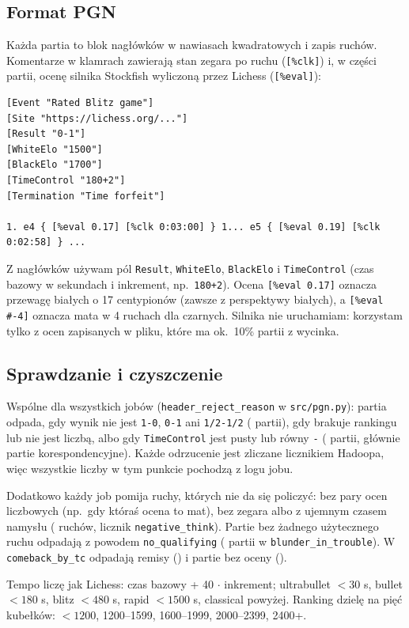 \documentclass[11pt,a4paper]{article}
\newcommand{\kod}[1]{\texttt{#1}}
\begin{document}
\subsection{Format PGN}
Każda partia to blok nagłówków w nawiasach kwadratowych i zapis ruchów. Komentarze w klamrach zawierają stan zegara po ruchu (\kod{[\%clk]}) i, w części partii, ocenę silnika Stockfish wyliczoną przez Lichess (\kod{[\%eval]}):
\begin{lstlisting}[style=plain]
[Event "Rated Blitz game"]
[Site "https://lichess.org/..."]
[Result "0-1"]
[WhiteElo "1500"]
[BlackElo "1700"]
[TimeControl "180+2"]
[Termination "Time forfeit"]

1. e4 { [%eval 0.17] [%clk 0:03:00] } 1... e5 { [%eval 0.19] [%clk 0:02:58] } ...
\end{lstlisting}
Z nagłówków używam pól \kod{Result}, \kod{WhiteElo}, \kod{BlackElo} i \kod{TimeControl} (czas bazowy w sekundach i inkrement, np.\ \kod{180+2}). Ocena \kod{[\%eval 0.17]} oznacza przewagę białych o 17 centypionów (zawsze z perspektywy białych), a \kod{[\%eval \#-4]} oznacza mata w 4 ruchach dla czarnych. Silnika nie uruchamiam: korzystam tylko z ocen zapisanych w pliku, które ma ok.\ 10\% partii z wycinka.

\subsection{Sprawdzanie i czyszczenie}
Wspólne dla wszystkich jobów (\kod{header\_reject\_reason} w \kod{src/pgn.py}): partia odpada, gdy wynik nie jest \kod{1-0}, \kod{0-1} ani \kod{1/2-1/2} (\nRejResult{} partii), gdy brakuje rankingu lub nie jest liczbą, albo gdy \kod{TimeControl} jest pusty lub równy \kod{-} (\nRejTimecontrol{} partii, głównie partie korespondencyjne). Każde odrzucenie jest zliczane licznikiem Hadoopa, więc wszystkie liczby w tym punkcie pochodzą z logu jobu.

Dodatkowo każdy job pomija ruchy, których nie da się policzyć: bez pary ocen liczbowych (np.\ gdy któraś ocena to mat), bez zegara albo z ujemnym czasem namysłu (\nNegativeThink{} ruchów, licznik \kod{negative\_think}). Partie bez żadnego użytecznego ruchu odpadają z powodem \kod{no\_qualifying} (\nNoQualifying{} partii w \kod{blunder\_in\_trouble}). W \kod{comeback\_by\_tc} odpadają remisy (\nNotDecisive) i partie bez oceny (\nNoEval).

Tempo liczę jak Lichess: czas bazowy + 40 $\cdot$ inkrement; ultrabullet $<30$ s, bullet $<180$ s, blitz $<480$ s, rapid $<1500$ s, classical powyżej. Ranking dzielę na pięć kubełków: $<1200$, 1200--1599, 1600--1999, 2000--2399, 2400+.
\end{document}

